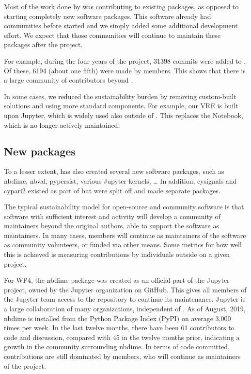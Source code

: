 \documentclass{deliverablereport}
\begin{document}
Most of the work done by \ODK was contributing to existing packages,
as opposed to starting completely new software packages.
This software already had communities before \ODK started
and we simply added some additional development effort.
We expect that those communities will continue to maintain
these packages after the project.

For example, during the four years of the \ODK project,
31398 commits were added to \Sage.
Of these, 6194
(about one fifth)  %
were made by \ODK members.
This shows that there is a large community of contributors beyond \ODK.

In some cases, we reduced the sustainability burden by removing
custom-built solutions and using more standard components.
For example, our VRE is built upon Jupyter, which is widely used
also outside of \ODK.
This replaces the \Sage Notebook, which is no longer actively maintained.

\subsection{New packages}

To a lesser extent,
\ODK has also created several new software packages,
such as nbdime, nbval, pypersist, various Jupyter kernels, \ldots
In addition, cysignals and cypari2 existed as part of \Sage but were split
off and made separate packages.

The typical sustainability model for open-source and community software
is that software with sufficient interest and activity will develop
a community of maintainers beyond the original authors,
able to support the software as maintainers.
In many cases, \ODK members will continue as maintainers of the software
as community volunteers, or funded via other means.
Some metrics for how well this is achieved is measuring contributions
by individuals outside \ODK on a given project.

For WP4, the nbdime package was created as an official part of the Jupyter project,
owned by the Jupyter organization on GitHub.
This gives all members of the Jupyter team access to the repository to continue its maintenance.
Jupyter is a large collaboration of many organizations, independent of \ODK.
As of August, 2019, nbdime is installed from the Python Package Index (PyPI) on average 3,000 times per week.
In the last twelve months, there have been 61 contributors to code and discussion, compared with 45 in the twelve months prior,
indicating a growth in the community surrounding nbdime.
In terms of code committed, contributions are still dominated by \ODK members,
who will continue as maintainers of the project.
\end{document}
